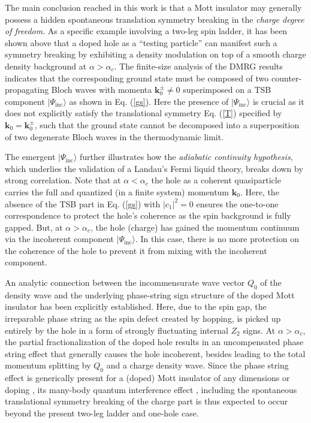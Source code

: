 \documentclass[aps,prb,twocolumn,notitlepage,superscriptaddress,showpacs]{revtex4-1}
\begin{document}
The main conclusion reached in this work is that a Mott insulator may generally possess a hidden spontaneous translation symmetry breaking in the \emph{charge degree of freedom}. As a specific example involving a two-leg spin ladder, it has been shown above that a doped hole as a ``testing particle'' can manifest such a symmetry breaking by exhibiting a density modulation on top of a smooth charge density background at $\alpha>\alpha_c$. The finite-size analysis of the DMRG results indicates that the corresponding ground state must be composed of two counter-propagating Bloch waves with momenta ${\textbf{k}}_0^{\pm}\neq 0$ superimposed on a TSB component $|\Psi_{\mathrm {inc}}\rangle$ as shown in Eq. (\ref{gs}). Here the presence of $|\Psi_{\mathrm {inc}}\rangle$ is crucial as it does not explicitly satisfy the translational symmetry Eq. (\ref{T}) specified by ${\textbf{k}}_0={\textbf{k}}_0^{\pm}$, such that the ground state cannot be decomposed into a superposition of two degenerate Bloch waves in the thermodynamic limit.

The emergent $|\Psi_{\mathrm {inc}}\rangle$ further illustrates how the \emph{adiabatic continuity hypothesis}, which underlies the validation of a Landau's Fermi liquid theory, breaks down by strong correlation. Note that at $\alpha<\alpha_c$ the hole as a coherent quasiparticle carries the full and quantized (in a finite system) momentum ${\textbf{k}}_0$. Here, the absence of the TSB part in Eq. (\ref{gs}) with $|c_1|^2= 0$ ensures the one-to-one correspondence to protect the hole's coherence as the spin background is fully gapped. But, at $\alpha>\alpha_c$, the hole (charge) has gained the momentum continuum via the incoherent component
$|\Psi_{\mathrm {inc}}\rangle$. In this case, there is no more protection on the coherence of the hole to prevent it from mixing with the incoherent component.


An analytic connection between the incommensurate wave vector $Q_0$ of the density wave and the underlying phase-string sign structure of the doped Mott insulator has been explicitly established. Here, due to the spin gap, the irreparable phase string as the spin defect created by hopping, is picked up entirely by the hole in a form of strongly fluctuating internal $Z_2$ signs. At $\alpha>\alpha_c$, the partial fractionalization of the doped hole results \cite{ZZ2014qp,ZZ2014cm} in an uncompensated phase string effect that generally causes the hole incoherent, besides leading to the total momentum splitting by $Q_0$ and a charge density wave. Since the phase string effect is generically present for a (doped) Mott insulator of any dimensions or doping \cite{Sheng1996,Wu2008sign}, its many-body quantum interference effect \cite{Zaanen2011,Weng2011b}, including the spontaneous translational symmetry breaking of the charge part is thus expected to occur beyond the present two-leg ladder and one-hole case.
\end{document}
